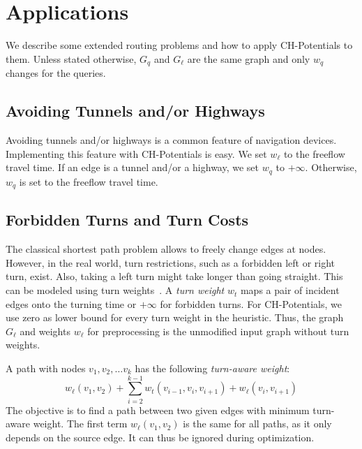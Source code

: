 \documentclass[a4paper,UKenglish,cleveref, autoref, thm-restate]{lipics-v2021}
\begin{document}
\section{Applications}
\label{sec:extensions}

We describe some extended routing problems and how to apply CH-Potentials to them.
Unless stated otherwise, $G_q$ and $G_\ell$ are the same graph and only $w_q$ changes for the queries.

\subsection{Avoiding Tunnels and/or Highways}
\label{sec:no-tunnel-highway}

Avoiding tunnels and/or highways is a common feature of navigation devices.
Implementing this feature with CH-Potentials is easy.
We set $w_\ell$ to the freeflow travel time.
If an edge is a tunnel and/or a highway, we set $w_q$ to $+\infty$.
Otherwise, $w_q$ is set to the freeflow travel time.

\subsection{Forbidden Turns and Turn Costs}
\label{sec:no-turns}

The classical shortest path problem allows to freely change edges at nodes.
However, in the real world, turn restrictions, such as a forbidden left or right turn, exist.
Also, taking a left turn might take longer than going straight.
This can be modeled using turn weights~\cite{gv-errnt-11,dgpw-crprn-13,bwzz-cchtc-20}.
A \emph{turn weight} $w_t$ maps a pair of incident edges onto the turning time or $+\infty$ for forbidden turns.
For CH-Potentials, we use zero as lower bound for every turn weight in the heuristic.
Thus, the graph $G_\ell$ and weights $w_\ell$ for preprocessing is the unmodified input graph without turn weights.

A path with nodes $v_1, v_2,\ldots v_k$ has the following \emph{turn-aware weight}: \[
w_\ell(v_1, v_2) + \sum_{i=2}^{k-1}  w_t(v_{i-1},v_i,v_{i+1}) + w_\ell(v_i,v_{i+1})
\]
The objective is to find a path between two given edges with minimum turn-aware weight.
The first term $w_\ell(v_1, v_2)$ is the same for all paths, as it only depends on the source edge.
It can thus be ignored during optimization.
\end{document}
